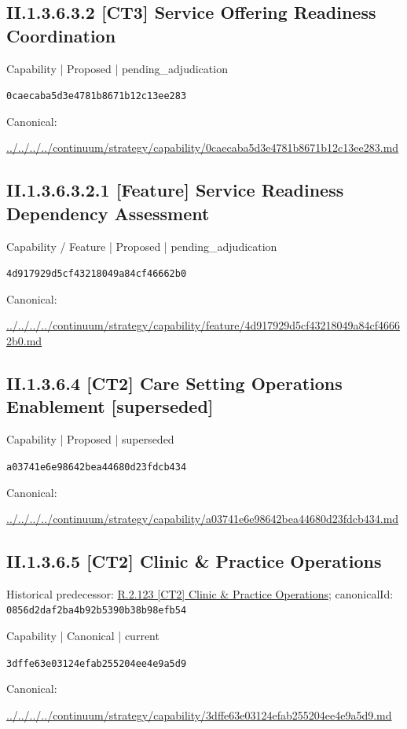 \documentclass[10pt,a4paper]{article}
\begin{document}
\subsection*{II.1.3.6.3.2 [CT3] Service Offering Readiness Coordination}
\label{element-0caecaba5d3e4781b8671b12c13ee283}
{\small Capability | Proposed | pending\_adjudication}\par
\texttt{0caecaba5d3e4781b8671b12c13ee283}\par
Canonical: \par
{\footnotesize\url{../../../../continuum/strategy/capability/0caecaba5d3e4781b8671b12c13ee283.md}}\par
\subsection*{II.1.3.6.3.2.1 [Feature] Service Readiness Dependency Assessment}
\label{element-4d917929d5cf43218049a84cf46662b0}
{\small Capability / Feature | Proposed | pending\_adjudication}\par
\texttt{4d917929d5cf43218049a84cf46662b0}\par
Canonical: \par
{\footnotesize\url{../../../../continuum/strategy/capability/feature/4d917929d5cf43218049a84cf46662b0.md}}\par
\subsection*{II.1.3.6.4 [CT2] Care Setting Operations Enablement [superseded]}
\label{element-a03741e6e98642bea44680d23fdcb434}
{\small Capability | Proposed | superseded}\par
\texttt{a03741e6e98642bea44680d23fdcb434}\par
Canonical: \par
{\footnotesize\url{../../../../continuum/strategy/capability/a03741e6e98642bea44680d23fdcb434.md}}\par
\subsection*{II.1.3.6.5 [CT2] Clinic \& Practice Operations}
Historical predecessor: \hyperref[element-0856d2daf2ba4b92b5390b38b98efb54]{R.2.123 [CT2] Clinic \& Practice Operations}; canonicalId: \texttt{0856d2daf2ba4b92b5390b38b98efb54}\par
\label{element-3dffe63e03124efab255204ee4e9a5d9}
{\small Capability | Canonical | current}\par
\texttt{3dffe63e03124efab255204ee4e9a5d9}\par
Canonical: \par
{\footnotesize\url{../../../../continuum/strategy/capability/3dffe63e03124efab255204ee4e9a5d9.md}}\par
\end{document}
